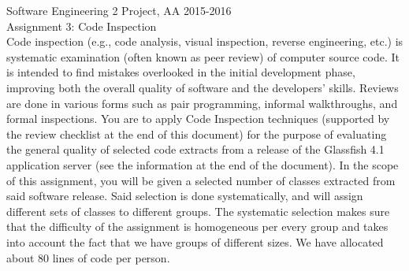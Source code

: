 \documentclass{../common/latex_classes/pdf_document}
\begin{document}
	\titleToc{}
	\newpage
	Software	Engineering	2 Project,	AA	2015-2016\\
	Assignment 3:	Code	Inspection\\
	Code	inspection	(e.g.,	code	analysis,	visual	inspection,	reverse	engineering,	etc.)
	is	 systematic	 examination	 (often	 known	 as	 peer	 review)	 of	 computer	 source	
	code.	It	is	intended	to	find	mistakes	overlooked	in	the	initial	development	phase,	
	improving	 both	 the	 overall	 quality	 of	 software	 and	 the	 developers'	 skills.	
	Reviews	 are	 done	 in	 various	 forms	 such	 as	 pair	 programming,	 informal	
	walkthroughs,	 and	 formal	 inspections.	 You	 are to	 apply	 Code Inspection	
	techniques	(supported	by	 the	review	checklist at	 the	end	of	 this	document)	for	
	the	 purpose	 of	 evaluating	 the	 general	 quality	 of	 selected	 code	 extracts	 from	 a	
	release	of	the	Glassfish	4.1	application	server (see	the	information	at	the	end	of	
	the	document).	
	In	 the	 scope	 of	 this	assignment,	 you	will	 be	given	a	 selected	number	 of	classes	
	extracted	 from	 said	 software	 release.	Said	 selection	is	done	 systematically,	and	
	will	assign	different	sets	of	classes	to	different	groups.	The	systematic	selection	
	makes	sure	that	the	difficulty	of	the	assignment	is	homogeneous	per	every	group
	and	 takes	into	account	 the	 fact	 that	we	have	groups	of	different	sizes. We	have	
	allocated	about	80 lines	of	code	per	person.	
	\newpage	
	
	\newpage
\end{document}
